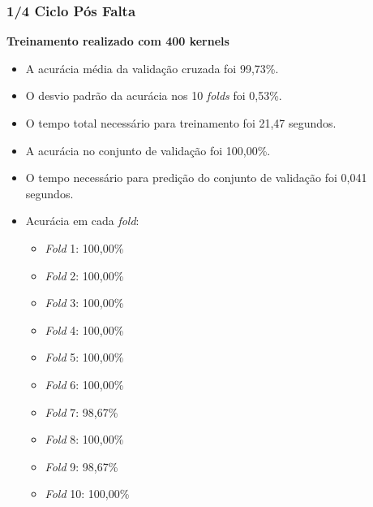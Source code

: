 \subsubsection{1/4 Ciclo Pós Falta}
\textbf{Treinamento realizado com 400 kernels}
\begin{itemize}
    \item A acurácia média da validação cruzada foi 99,73\%.
    \item O desvio padrão da acurácia nos 10 \textit{folds} foi 0,53\%.
    \item O tempo total necessário para treinamento foi 21,47 segundos.
    \item A acurácia no conjunto de validação foi 100,00\%.
    \item O tempo necessário para predição do conjunto de validação foi 0,041 segundos.
    \item Acurácia em cada \textit{fold}:
    \begin{itemize}
        \item \textit{Fold} 1: 100,00\%
        \item \textit{Fold} 2: 100,00\%
        \item \textit{Fold} 3: 100,00\%
        \item \textit{Fold} 4: 100,00\%
        \item \textit{Fold} 5: 100,00\%
        \item \textit{Fold} 6: 100,00\%
        \item \textit{Fold} 7: 98,67\%
        \item \textit{Fold} 8: 100,00\%
        \item \textit{Fold} 9: 98,67\%
        \item \textit{Fold} 10: 100,00\%
    \end{itemize}
\end{itemize}

